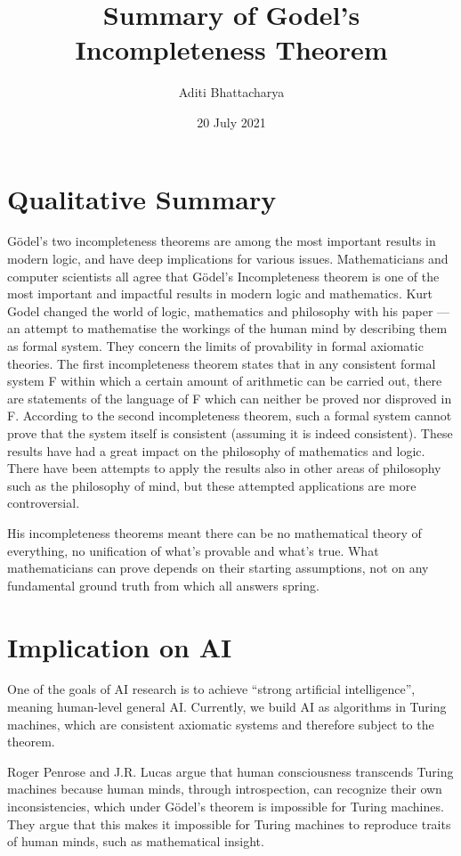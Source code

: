 \documentclass{article}
\title{Summary of Godel's Incompleteness Theorem}
\author{Aditi Bhattacharya }
\date{20 July 2021}
\begin{document}
\maketitle
\section{ Qualitative Summary}
Gödel’s two incompleteness theorems are among the most important results in modern logic, and have deep implications for various issues. Mathematicians and computer scientists all agree that Gödel’s Incompleteness theorem is one of the most important and impactful results in modern logic and mathematics. Kurt Godel changed the world of logic, mathematics and philosophy with his paper — an attempt to mathematise the workings of the human mind by describing them as formal system. They concern the limits of provability in formal axiomatic theories. The first incompleteness theorem states that in any consistent formal system F  within which a certain amount of arithmetic can be carried out, there are statements of the language of F which can neither be proved nor disproved in F. According to the second incompleteness theorem, such a formal system cannot prove that the system itself is consistent (assuming it is indeed consistent). These results have had a great impact on the philosophy of mathematics and logic. There have been attempts to apply the results also in other areas of philosophy such as the philosophy of mind, but these attempted applications are more controversial.

His incompleteness theorems meant there can be no mathematical theory of everything, no unification of what’s provable and what’s true. What mathematicians can prove depends on their starting assumptions, not on any fundamental ground truth from which all answers spring.
\section{Implication on AI}
One of the goals of AI research is to achieve “strong artificial intelligence”, meaning human-level general AI. Currently, we build AI as algorithms in Turing machines, which are consistent axiomatic systems and therefore subject to the theorem.

Roger Penrose and J.R. Lucas argue that human consciousness transcends Turing machines because human minds, through introspection, can recognize their own inconsistencies, which under Gödel’s theorem is impossible for Turing machines. They argue that this makes it impossible for Turing machines to reproduce traits of human minds, such as mathematical insight.
\end{document}
